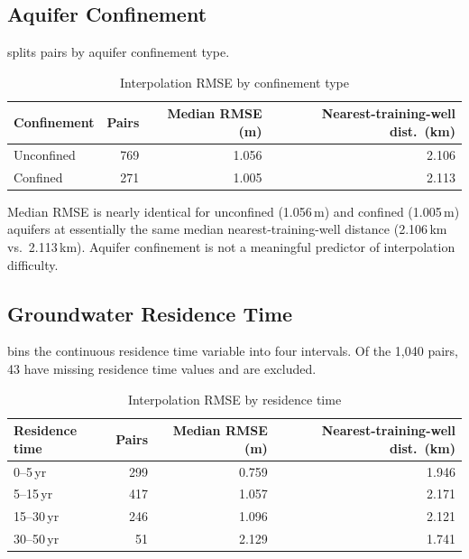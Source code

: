 \subsection{Aquifer Confinement}
\label{sec:confinement_breakdown}

 splits pairs by aquifer confinement type.

\begin{table}[htbp]
\centering
\begin{tabular}{lrrr}
\toprule
\textbf{Confinement} & \textbf{Pairs} & \textbf{Median RMSE (m)} & \textbf{Nearest-training-well dist.\ (km)} \\
\midrule
Unconfined & 769 & 1.056 & 2.106 \\
Confined   & 271 & 1.005 & 2.113 \\
\bottomrule
\end{tabular}
\caption{Interpolation RMSE by confinement type}
\label{tab:confinement_breakdown}
\end{table}

Median RMSE is nearly identical for unconfined (1.056\,m) and confined (1.005\,m) aquifers
at essentially the same median nearest-training-well distance (2.106\,km vs.\ 2.113\,km). Aquifer
confinement is not a meaningful predictor of interpolation difficulty.

\subsection{Groundwater Residence Time}
\label{sec:residence_time_breakdown}

 bins the continuous residence time variable into four
intervals. Of the 1{,}040 pairs, 43 have missing residence time values and are excluded.

\begin{table}[htbp]
\centering
\begin{tabular}{lrrr}
\toprule
\textbf{Residence time} & \textbf{Pairs} & \textbf{Median RMSE (m)} & \textbf{Nearest-training-well dist.\ (km)} \\
\midrule
0--5\,yr   & 299 & 0.759 & 1.946 \\
5--15\,yr  & 417 & 1.057 & 2.171 \\
15--30\,yr & 246 & 1.096 & 2.121 \\
30--50\,yr &  51 & 2.129 & 1.741 \\
\bottomrule
\end{tabular}
\caption{Interpolation RMSE by residence time}
\label{tab:residence_time_breakdown}
\end{table}

